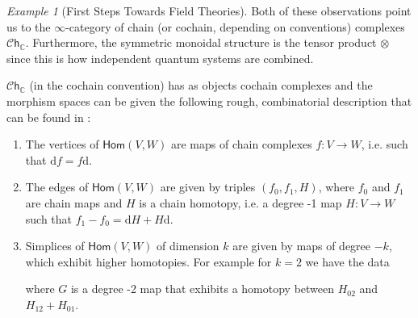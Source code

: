 \documentclass[12pt,a4paper]{article}
\newcounter{counter} \numberwithin{counter}{section}
\theoremstyle{definition}
\theoremstyle{plain}
\theoremstyle{remark}
\newtheorem{example}[counter]{Example}
\begin{document}
\begin{example}[First Steps Towards Field Theories]
    Both of these observations point us to the $\infty$-category of chain (or cochain, depending on conventions) complexes $\mathscr{C}\mathsf{h}_{\mathbb{C}}$. Furthermore, the symmetric monoidal structure is the tensor product $\otimes$ since this is how independent quantum systems are combined.

    $\mathscr{C}\mathsf{h}_{\mathbb{C}}$ (in the cochain convention) has as objects cochain complexes and the morphism spaces can be given the following rough, combinatorial description that can be found in \cite{tanaka20}:
    \begin{enumerate}
        \item The vertices of $\mathsf{Hom}(V, W)$ are maps of chain complexes $f: V \rightarrow W$, i.e. such that $\mathrm{d} f = f \mathrm{d}$.
        \item The edges of $\mathsf{Hom}(V, W)$ are given by triples $(f_0, f_1, H)$, where $f_0$ and $f_1$ are chain maps and $H$ is a chain homotopy, i.e. a degree -1 map $H: V \rightarrow W$ such that $f_1 - f_0 = \mathrm{d} H + H \mathrm{d}$.
        \item Simplices of $\mathsf{Hom}(V, W)$ of dimension $k$ are given by maps of degree $-k$, which exhibit higher homotopies. For example for $k=2$ we have the data
        \begin{center}
        \end{center}
        where $G$ is a degree -2 map that exhibits a homotopy between $H_{02}$ and $H_{12} + H_{01}$.
    \end{enumerate}
\end{example}
\end{document}
